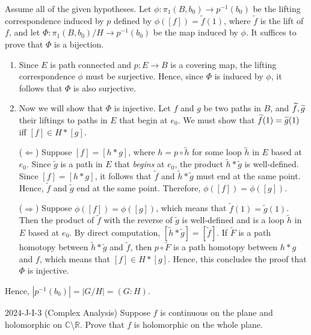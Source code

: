 \documentclass{article}
\begin{document}
\begin{solutions}
	Assume all of the given hypotheses. Let $\phi: \pi_{1}(B, b_{0}) \to p^{-1}(b_{0})$ be the lifting correspondence induced by $p$ defined by $\phi([f]) = \tilde{f}(1)$, where $\tilde{f}$ is the lift of $f$, and let $\Phi: \pi_{1}(B, b_{0})/H \to p^{-1}(b_{0})$ be the map induced by $\phi$. It suffices to prove that $\Phi$ is a bijection. 
		\begin{enumerate}[itemsep =-2pt,label = (\roman{*})]
			\item Since $E$ is path connected and $p: E \to B$ is a covering map, the lifting correspondence $\phi$ must be surjective. Hence, since $\Phi$ is induced by $\phi$, it follows that $\Phi$ is also surjective. 
			\item Now we will show that $\Phi$ is injective. Let $f$ and $g$ be two paths in $B$, and $\widetilde{f}, \widetilde{g}$ their liftings to paths in $E$ that begin at $e_{0}$. We must show that $\widetilde{f}(1) = \widetilde{g}(1)$ iff $[f] \in H \ast [g]$. 
			
			($\Leftarrow$) Suppose $[f] = [h \ast g]$, where $h = p \circ \tilde{h}$ for some loop $\tilde{h}$ in $E$ based at $e_{0}$. Since $\tilde{g}$ is a path in $E$ that \textit{begins} at $e_{0}$, the product $\tilde{h} \ast \tilde{g}$ is well-defined. Since $[f] = [h \ast g]$, it follows that $\tilde{f}$ and $\tilde{h} \ast \tilde{g}$ must end at the same point. Hence, $\tilde{f}$ and $\tilde{g}$ end at the same point. Therefore, $\phi([f]) = \phi([g])$. 
			
			($\Rightarrow$) Suppose $\phi([f]) = \phi([g])$, which means that $\tilde{f}(1) = \tilde{g}(1)$. Then the product of $\tilde{f}$ with the reverse of $\tilde{g}$ is well-defined and is a loop $\tilde{h}$ in $E$ based at $e_{0}$. By direct computation, $[\tilde{h} \ast \tilde{g}] = [\tilde{f}]$. If $\tilde{F}$ is a path homotopy between $\tilde{h} \ast \tilde{g}$ and $\tilde{f}$, then $p \circ \tilde{F}$ is a path homotopy between $h \ast g$ and $f$, which means that $[f] \in H\ast [g]$. Hence, this concludes the proof that $\Phi$ is injective. 
		\end{enumerate}
	Hence, $|p^{-1}(b_{0})| = |G/H| = (G:H)$. 
\end{solutions}
\begin{prb}{2024-J-I-3 (Complex Analysis)}
	Suppose $f$ is continuous on the plane and holomorphic on $\mathbb{C}\setminus \mathbb{R}$. Prove that $f$ is holomorphic on the whole plane. 
\end{prb}
\end{document}
